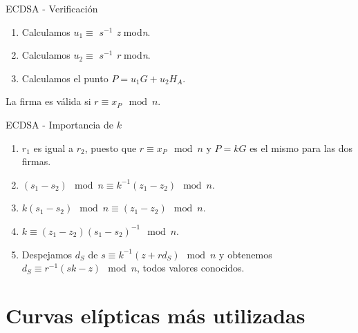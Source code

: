 \documentclass[12pt]{beamer}
\begin{document}
\begin{frame}[fragile]{ECDSA - Verificación}
\begin{enumerate}
	\item Calculamos $u_1 \equiv$ \textit{$s^{-1}$ z} mod\textit{n}.
	\item Calculamos $u_2 \equiv$ \textit{$s^{-1}$ r} mod\textit{n}.
	\item Calculamos el punto $P = u_1G + u_2 H_A$.	
\end{enumerate}

\vspace{2mm}
  La firma es válida si $r \equiv x_P \mod n$.

\end{frame}

\begin{frame}[fragile]{ECDSA - Importancia de $k$}
  \begin{enumerate}
	\item $r_1$ es igual a $r_2$, puesto que $ r \equiv x_P \mod n$ y $P = kG$ es el mismo para las dos firmas.
	\item  $(s_1 - s_2) \mod n \equiv k^{-1} (z_1 - z_2) \mod n$.
	\item $k(s_1 - s_2) \mod n \equiv (z_1 - z_2) \mod n$.
	\item $k  \equiv (z_1 - z_2) (s_1 -s_2)^{-1} \mod n$.
        \item Despejamos $d_S$ de $s \equiv k^{-1}(z + r d_S) \mod n$ y obtenemos $d_S \equiv r^{-1}(sk - z) \mod n$, todos valores conocidos. 
\end{enumerate}
\end{frame}

\section{Curvas elípticas más utilizadas}\label{ej_curvas}
\end{document}
